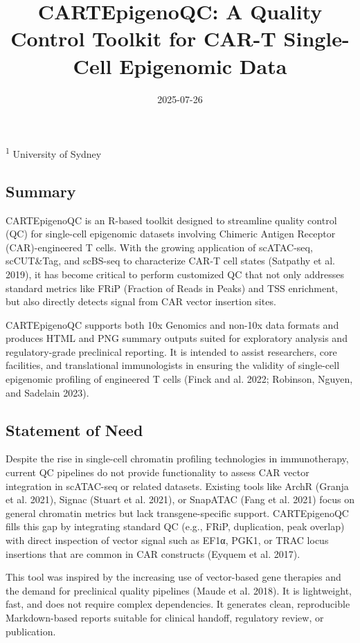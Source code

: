 \documentclass[
]{article}
\title{CARTEpigenoQC: A Quality Control Toolkit for CAR-T Single-Cell
Epigenomic Data}
\author{}
\date{\vspace{-2.5em}2025-07-26}
\begin{document}
\maketitle

\textsuperscript{1} University of Sydney

\subsection{Summary}\label{summary}

CARTEpigenoQC is an R-based toolkit designed to streamline quality
control (QC) for single-cell epigenomic datasets involving Chimeric
Antigen Receptor (CAR)-engineered T cells. With the growing application
of scATAC-seq, scCUT\&Tag, and scBS-seq to characterize CAR-T cell
states (Satpathy et al. 2019), it has become critical to perform
customized QC that not only addresses standard metrics like FRiP
(Fraction of Reads in Peaks) and TSS enrichment, but also directly
detects signal from CAR vector insertion sites.

CARTEpigenoQC supports both 10x Genomics and non-10x data formats and
produces HTML and PNG summary outputs suited for exploratory analysis
and regulatory-grade preclinical reporting. It is intended to assist
researchers, core facilities, and translational immunologists in
ensuring the validity of single-cell epigenomic profiling of engineered
T cells (Finck and al. 2022; Robinson, Nguyen, and Sadelain 2023).

\subsection{Statement of Need}\label{statement-of-need}

Despite the rise in single-cell chromatin profiling technologies in
immunotherapy, current QC pipelines do not provide functionality to
assess CAR vector integration in scATAC-seq or related datasets.
Existing tools like ArchR (Granja et al. 2021), Signac (Stuart et al.
2021), or SnapATAC (Fang et al. 2021) focus on general chromatin metrics
but lack transgene-specific support. CARTEpigenoQC fills this gap by
integrating standard QC (e.g., FRiP, duplication, peak overlap) with
direct inspection of vector signal such as EF1α, PGK1, or TRAC locus
insertions that are common in CAR constructs (Eyquem et al. 2017).

This tool was inspired by the increasing use of vector-based gene
therapies and the demand for preclinical quality pipelines (Maude et al.
2018). It is lightweight, fast, and does not require complex
dependencies. It generates clean, reproducible Markdown-based reports
suitable for clinical handoff, regulatory review, or publication.
\end{document}
